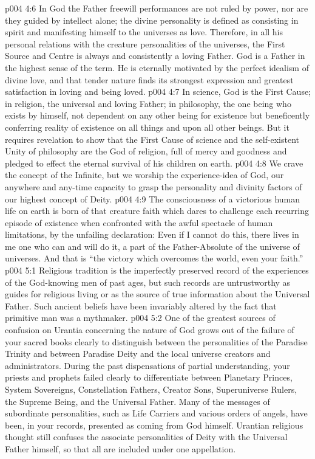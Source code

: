 \vs p004 4:6 In God the Father freewill performances are not ruled by power, nor are they guided by intellect alone; the divine personality is defined as consisting in spirit and manifesting himself to the universes as love. Therefore, in all his personal relations with the creature personalities of the universes, the First Source and Centre is always and consistently a loving Father. God is a Father in the highest sense of the term. He is eternally motivated by the perfect idealism of divine love, and that tender nature finds its strongest expression and greatest satisfaction in loving and being loved.
\vs p004 4:7 \pc In science, God is the First Cause; in religion, the universal and loving Father; in philosophy, the one being who exists by himself, not dependent on any other being for existence but beneficently conferring reality of existence on all things and upon all other beings. But it requires revelation to show that the First Cause of science and the self\hyp{}existent Unity of philosophy are the God of religion, full of mercy and goodness and pledged to effect the eternal survival of his children on earth.
\vs p004 4:8 We crave the concept of the Infinite, but we worship the experience\hyp{}idea of God, our anywhere and any\hyp{}time capacity to grasp the personality and divinity factors of our highest concept of Deity.
\vs p004 4:9 The consciousness of a victorious human life on earth is born of that creature faith which dares to challenge each recurring episode of existence when confronted with the awful spectacle of human limitations, by the unfailing declaration: Even if I cannot do this, there lives in me one who can and will do it, a part of the Father\hyp{}Absolute of the universe of universes. And that is “the victory which overcomes the world, even your faith.”
\vs p004 5:1 Religious tradition is the imperfectly preserved record of the experiences of the God\hyp{}knowing men of past ages, but such records are untrustworthy as guides for religious living or as the source of true information about the Universal Father. Such ancient beliefs have been invariably altered by the fact that primitive man was a mythmaker.
\vs p004 5:2 One of the greatest sources of confusion on Urantia concerning the nature of God grows out of the failure of your sacred books clearly to distinguish between the personalities of the Paradise Trinity and between Paradise Deity and the local universe creators and administrators. During the past dispensations of partial understanding, your priests and prophets failed clearly to differentiate between Planetary Princes, System Sovereigns, Constellation Fathers, Creator Sons, Superuniverse Rulers, the Supreme Being, and the Universal Father. Many of the messages of subordinate personalities, such as Life Carriers and various orders of angels, have been, in your records, presented as coming from God himself. Urantian religious thought still confuses the associate personalities of Deity with the Universal Father himself, so that all are included under one appellation.
